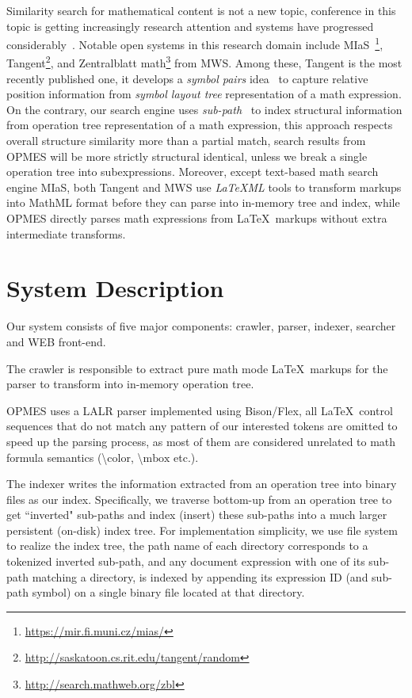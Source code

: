 \documentclass{llncs}
\begin{document}
Similarity search for mathematical content is not a new topic, conference in this topic is getting increasingly research attention and systems have progressed considerably~\cite{ov}.
Notable open systems in this research domain include 
MIaS~\footnote{\url{https://mir.fi.muni.cz/mias/}}, 
Tangent\footnote{\url{http://saskatoon.cs.rit.edu/tangent/random}},
and Zentralblatt math\footnote{\url{http://search.mathweb.org/zbl}} from MWS.
Among these, 
Tangent is the most recently published one, it develops a \textit{symbol pairs} idea~\cite{symbolpairs15} to capture relative position information from \textit{symbol layout tree} representation of a math expression.
On the contrary, our search engine uses \textit{sub-path}~\cite{signifjap} to index structural information from operation tree representation of a math expression, this approach respects overall structure similarity more than a partial match, search results from OPMES will be more strictly structural identical, unless we break a single operation tree into subexpressions.
Moreover, except text-based math search engine MIaS, both Tangent and MWS use \textit{LaTeXML} tools to transform  markups into MathML format before they can parse into in-memory tree and index, while OPMES directly parses math expressions from \LaTeX\ markups without extra intermediate transforms.

\section{System Description}
Our system consists of five major components: crawler, parser, indexer, searcher and WEB front-end.

The crawler is responsible to extract pure math mode \LaTeX\ markups for the parser to transform into in-memory operation tree. 

OPMES uses a LALR parser implemented using Bison/Flex, all \LaTeX\ control sequences that do not match any pattern of our interested tokens are omitted to speed up the parsing process, 
as most of them are considered unrelated to math formula semantics (\textbackslash$\text{color}$, \textbackslash$\text{mbox}$ etc.).

The indexer writes the information extracted from an operation tree into binary files as our index. 
Specifically, we traverse bottom-up from an operation tree to get ``inverted" sub-paths and index (insert) these sub-paths into a much larger persistent (on-disk) index tree.
For implementation simplicity, we use file system to realize the index tree, the path name of each directory corresponds to a tokenized inverted sub-path, 
and any document expression with one of its sub-path matching a directory, is indexed by appending its expression ID (and sub-path symbol) on a single binary file located at that directory.
\end{document}
